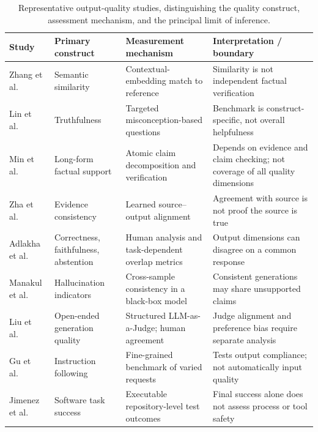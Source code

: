 \begin{table}[t]
\centering
\footnotesize
\caption{Representative output-quality studies, distinguishing the quality construct, assessment mechanism, and the principal limit of inference.}
\label{tab:output-quality-studies}
\begin{tabular}{p{} p{} p{} p{}}
\toprule
\textbf{Study} & \textbf{Primary construct} & \textbf{Measurement mechanism} & \textbf{Interpretation / boundary} \\
\midrule
Zhang et al.\ \cite{zhang2020bertscore} & Semantic similarity & Contextual-embedding match to reference & Similarity is not independent factual verification \\
Lin et al.\ \cite{lin2022truthfulqa} & Truthfulness & Targeted misconception-based questions & Benchmark is construct-specific, not overall helpfulness \\
Min et al.\ \cite{min2023factscore} & Long-form factual support & Atomic claim decomposition and verification & Depends on evidence and claim checking; not coverage of all quality dimensions \\
Zha et al.\ \cite{zha2023alignscore} & Evidence consistency & Learned source--output alignment & Agreement with source is not proof the source is true \\
Adlakha et al.\ \cite{adlakha2024correctness} & Correctness, faithfulness, abstention & Human analysis and task-dependent overlap metrics & Output dimensions can disagree on a common response \\
Manakul et al.\ \cite{manakul2023selfcheckgpt} & Hallucination indicators & Cross-sample consistency in a black-box model & Consistent generations may share unsupported claims \\
Liu et al.\ \cite{liu2023geval} & Open-ended generation quality & Structured LLM-as-a-Judge; human agreement & Judge alignment and preference bias require separate analysis \\
Gu et al.\ \cite{gu2024dingo} & Instruction following & Fine-grained benchmark of varied requests & Tests output compliance; not automatically input quality \\
Jimenez et al.\ \cite{jimenez2024swebench} & Software task success & Executable repository-level test outcomes & Final success alone does not assess process or tool safety \\
\bottomrule
\end{tabular}
\end{table}

